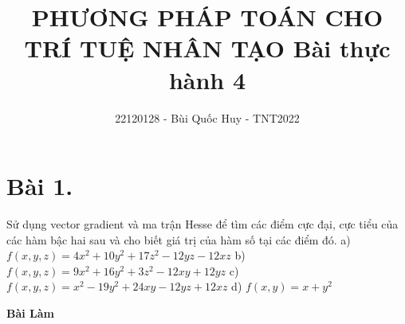 \documentclass[11pt]{article}
\title{\textbf{PHƯƠNG PHÁP TOÁN CHO TRÍ TUỆ NHÂN TẠO \newline Bài thực hành 4}}
\author{22120128 - Bùi Quốc Huy - TNT2022}
\begin{document}
\maketitle

\section*{Bài 1.} 
Sử dụng vector gradient và ma trận Hesse để tìm các điểm cực đại, cực tiểu của các hàm bậc hai sau và cho biết giá trị của hàm số tại các điểm đó.
\newline a) $ f(x, y, z) = 4x^2 + 10y^2 + 17z^2 - 12yz - 12xz $
\newline b) $ f(x, y, z) = 9x^2 + 16y^2 + 3z^2 - 12xy + 12yz $
\newline c) $ f(x, y, z) = x^2 - 19y^2 + 24xy - 12yz + 12xz $
\newline d) $ f(x, y) = x + y^2 $ 

\begin{center}
    \textbf{Bài Làm}
\end{center}
 
\end{document}
